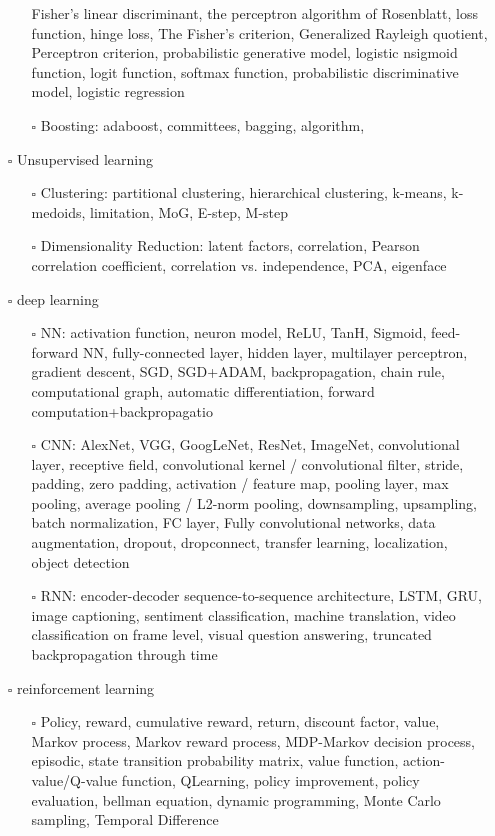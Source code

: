 \documentclass[11pt]{article}
\begin{document}
\begin{itemize}
\begin{itemize}
Fisher’s linear discriminant, the perceptron algorithm of Rosenblatt, loss
function, hinge loss, The Fisher’s criterion, Generalized Rayleigh
quotient, Perceptron criterion, probabilistic generative model, logistic
nsigmoid function, logit function, softmax function, probabilistic
discriminative model, logistic regression
\item[{$\square$}] Boosting: adaboost, committees, bagging, algorithm,
\end{itemize}
\item[{$\square$}] Unsupervised learning
\begin{itemize}
\item[{$\square$}] Clustering: partitional clustering, hierarchical clustering, k-means,
k-medoids, limitation, MoG, E-step, M-step
\item[{$\square$}] Dimensionality Reduction: latent factors, correlation, Pearson
correlation coefficient, correlation vs. independence, PCA, eigenface
\end{itemize}
\item[{$\square$}] deep learning
\begin{itemize}
\item[{$\square$}] NN: activation function, neuron model, ReLU, TanH, Sigmoid,
feed-forward NN, fully-connected layer, hidden layer, multilayer
perceptron, gradient descent, SGD, SGD+ADAM, backpropagation, chain rule,
computational graph, automatic differentiation, forward
computation+backpropagatio
\item[{$\square$}] CNN: AlexNet, VGG, GoogLeNet, ResNet, ImageNet, convolutional layer,
receptive field, convolutional kernel / convolutional filter, stride,
padding, zero padding, activation / feature map, pooling layer, max
pooling, average pooling / L2-norm pooling, downsampling, upsampling,
batch normalization, FC layer, Fully convolutional networks, data
augmentation, dropout, dropconnect, transfer learning, localization,
object detection
\item[{$\square$}] RNN: encoder-decoder sequence-to-sequence architecture, LSTM, GRU,
image captioning, sentiment classification, machine translation, video
classification on frame level, visual question answering, truncated
backpropagation through time
\end{itemize}
\item[{$\square$}] reinforcement learning
\begin{itemize}
\item[{$\square$}] Policy, reward, cumulative reward, return, discount factor, value,
Markov process, Markov reward process, MDP-Markov decision process,
episodic, state transition probability matrix, value function,
action-value/Q-value function, QLearning, policy improvement, policy
evaluation, bellman equation, dynamic programming, Monte Carlo sampling,
Temporal Difference
\end{itemize}
\end{itemize}
\end{document}
